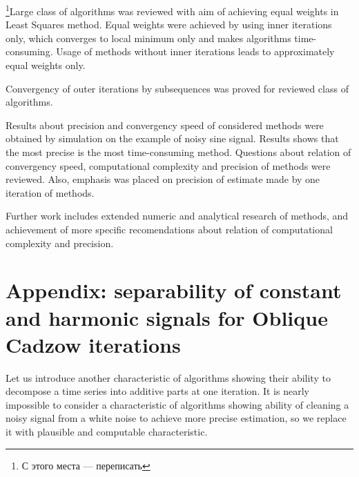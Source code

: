 \documentclass[12pt,a4paper,fleqn,leqno]{article}
\begin{document}
\footnote{С этого места --- переписать}Large class of algorithms was reviewed with aim of achieving equal weights in Least Squares method. Equal weights were achieved by using inner iterations only, which converges to local minimum only and makes algorithms time-consuming. Usage of methods without inner iterations leads to approximately equal weights only.

Convergency of outer iterations by subsequences was proved for reviewed class of algorithms.

Results about precision and convergency speed of considered methods were obtained by simulation on the example of noisy sine signal. Results shows that the most precise is the most time-consuming method. Questions about relation of convergency speed, computational complexity and precision of methods were reviewed. Also, emphasis was placed on precision of estimate made by one iteration of methods.

Further work includes extended numeric and analytical research of methods, and achievement of more specific recomendations about relation of computational complexity and precision.

%



\section{Appendix: separability of constant and harmonic signals for Oblique Cadzow iterations}
\label{sec:app}

Let us introduce another characteristic of algorithms showing their ability to decompose a time series into additive parts at one iteration. It is nearly impossible to consider a characteristic of algorithms showing ability of cleaning a noisy signal from a white noise to achieve more precise estimation, so we replace it with plausible and computable characteristic.
\end{document}
